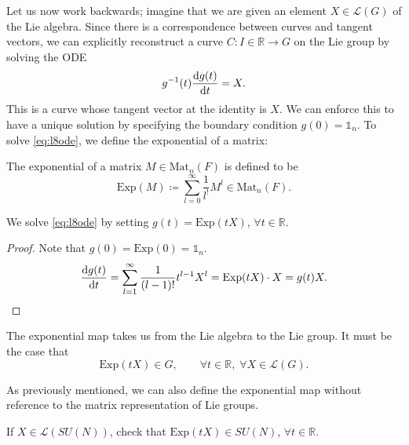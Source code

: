 \begin{wrapfigure}{L}{0.25\columnwidth}
  \centering
  \def\svgwidth{0.2\columnwidth}
  
  \caption{}
  \label{fig:l8f5}
\end{wrapfigure}
Let us now work backwards; imagine that we are given an element $X \in \mathscr{L}(G)$ of the Lie algebra.
Since there is a correspondence between curves and tangent vectors, we can explicitly reconstruct a curve $C \colon I \in \mathbb{R} \to G$ on the Lie group by solving the ODE
\begin{equation}
  \label{eq:l8ode}
  g^{-1}(t) \dv{g(t)}{t} = X.
\end{equation}
This is a curve whose tangent vector at the identity is $X$.
We can enforce this to have a unique solution by specifying the boundary condition $g(0) = \mathbb{1}_n$.
To solve \eqref{eq:l8ode}, we define the exponential of a matrix:
\begin{definition}[]
  The exponential of a matrix $M \in \text{Mat}_n(F)$ is defined to be
  \begin{equation}
    \text{Exp}(M) \coloneqq \sum_{l =0}^{\infty} \frac{1}{l^!} M^l \in \text{Mat}_n(F).
  \end{equation}
\end{definition}
\begin{claim}
  We solve \eqref{eq:l8ode} by setting $g(t) = \text{Exp}(t X)$, $\forall t \in \mathbb{R}.$
\end{claim}
\begin{proof}
  Note that $g(0) = \text{Exp}(0) = \mathbb{1}_n$.
  \begin{equation}
    \dv{g(t)}{t} = \sum_{l = 1}^\infty \frac{1}{(l-1)!} t^{l-1} X^l = \text{Exp}(t X) \cdot X = g(t) X.
  \end{equation}
\end{proof}
The exponential map takes us from the Lie algebra to the Lie group.
It must be the case that
\begin{equation}
  \text{Exp}(t X) \in G, \qquad \forall t \in \mathbb{R},\; \forall X \in \mathscr{L}(G).
\end{equation}
\begin{leftbar}
  \begin{remark}
    As previously mentioned, we can also define the exponential map without reference to the matrix representation of Lie groups.
  \end{remark}
\end{leftbar}

\begin{exercise}
  If $X \in \mathscr{L}(SU(N))$, check that $\text{Exp}(t X) \in SU(N)$, $\forall t \in \mathbb{R}$.
\end{exercise}

